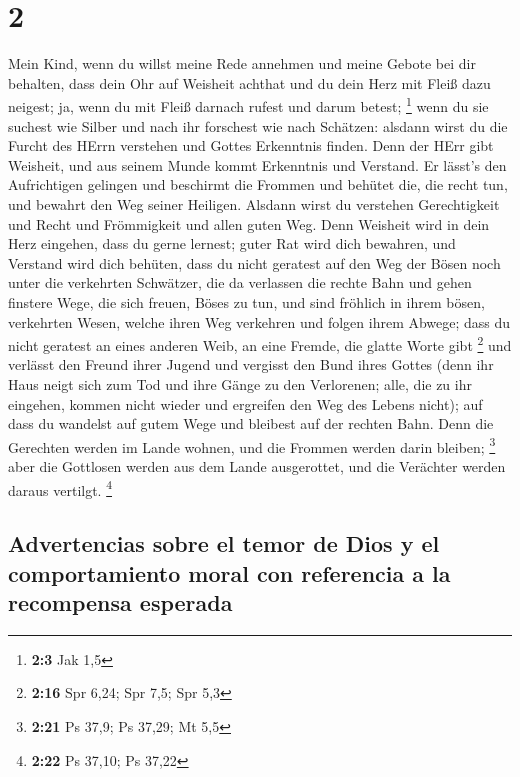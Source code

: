 \hypertarget{section-1}{%
\section{2}\label{section-1}}

 Mein Kind, wenn du willst meine Rede annehmen und meine
Gebote bei dir behalten,  dass dein Ohr auf Weisheit
achthat und du dein Herz mit Fleiß dazu neigest;  ja, wenn
du mit Fleiß darnach rufest und darum betest; \footnote{\textbf{2:3} Jak
  1,5}  wenn du sie suchest wie Silber und nach ihr
forschest wie nach Schätzen:  alsdann wirst du die Furcht
des HErrn verstehen und Gottes Erkenntnis finden.  Denn
der HErr gibt Weisheit, und aus seinem Munde kommt Erkenntnis und
Verstand.  Er lässt's den Aufrichtigen gelingen und
beschirmt die Frommen  und behütet die, die recht tun, und
bewahrt den Weg seiner Heiligen.  Alsdann wirst du
verstehen Gerechtigkeit und Recht und Frömmigkeit und allen guten Weg.
 Denn Weisheit wird in dein Herz eingehen, dass du gerne
lernest;  guter Rat wird dich bewahren, und Verstand wird
dich behüten,  dass du nicht geratest auf den Weg der
Bösen noch unter die verkehrten Schwätzer,  die da
verlassen die rechte Bahn und gehen finstere Wege,  die
sich freuen, Böses zu tun, und sind fröhlich in ihrem bösen, verkehrten
Wesen,  welche ihren Weg verkehren und folgen ihrem
Abwege;  dass du nicht geratest an eines anderen Weib, an
eine Fremde, die glatte Worte gibt \footnote{\textbf{2:16} Spr 6,24; Spr
  7,5; Spr 5,3}  und verlässt den Freund ihrer Jugend und
vergisst den Bund ihres Gottes  (denn ihr Haus neigt sich
zum Tod und ihre Gänge zu den Verlorenen;  alle, die zu
ihr eingehen, kommen nicht wieder und ergreifen den Weg des Lebens
nicht);  auf dass du wandelst auf gutem Wege und bleibest
auf der rechten Bahn.  Denn die Gerechten werden im Lande
wohnen, und die Frommen werden darin bleiben; \footnote{\textbf{2:21} Ps
  37,9; Ps 37,29; Mt 5,5}  aber die Gottlosen werden aus
dem Lande ausgerottet, und die Verächter werden daraus vertilgt.
\footnote{\textbf{2:22} Ps 37,10; Ps 37,22}

\hypertarget{advertencias-sobre-el-temor-de-dios-y-el-comportamiento-moral-con-referencia-a-la-recompensa-esperada}{%
\subsection{Advertencias sobre el temor de Dios y el comportamiento
moral con referencia a la recompensa
esperada}\label{advertencias-sobre-el-temor-de-dios-y-el-comportamiento-moral-con-referencia-a-la-recompensa-esperada}}

